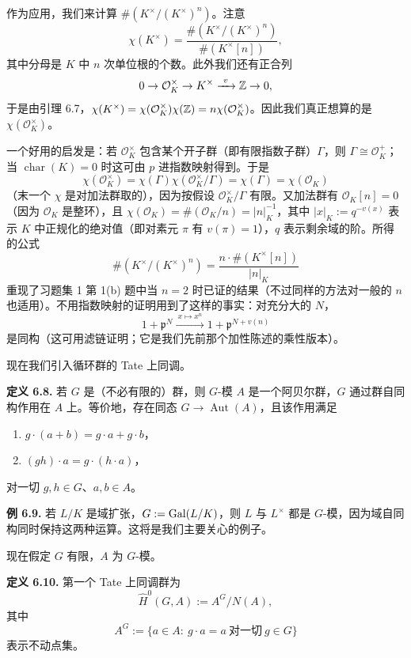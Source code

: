 作为应用，我们来计算 $\#(K^\times/(K^\times)^n)$。注意
\[
\chi(K^\times)=\frac{\#(K^\times/(K^\times)^n)}{\#(K^\times[n])},
\]
其中分母是 $K$ 中 $n$ 次单位根的个数。此外我们还有正合列
\[
0\to\mathcal{O}_K^\times\to K^\times\xrightarrow{\ v\ }\mathbb{Z}\to 0,
\]
于是由引理 6.7，$\chi(K^\times)=\chi(\mathcal{O}_K^\times)\chi(\mathbb{Z})=n\chi(\mathcal{O}_K^\times)$。因此我们真正想算的是 $\chi(\mathcal{O}_K^\times)$。

一个好用的启发是：若 $\mathcal{O}_K^\times$ 包含某个开子群（即有限指数子群）$\Gamma$，则 $\Gamma\cong\mathcal{O}_K^+$；当 $\operatorname{char}(K)=0$ 时这可由 $p$ 进指数映射得到。于是
\begin{equation}\tag{6.2}
\chi(\mathcal{O}_K^\times)=\chi(\Gamma)\chi(\mathcal{O}_K^\times/\Gamma)=\chi(\Gamma)=\chi(\mathcal{O}_K)
\end{equation}
（末一个 $\chi$ 是对加法群取的），因为按假设 $\mathcal{O}_K^\times/\Gamma$ 有限。又加法群有 $\mathcal{O}_K[n]=0$（因为 $\mathcal{O}_K$ 是整环），且 $\chi(\mathcal{O}_K)=\#(\mathcal{O}_K/n)=|n|_K^{-1}$，其中 $|x|_K:=q^{-v(x)}$ 表示 $K$ 中正规化的绝对值（即对素元 $\pi$ 有 $v(\pi)=1$），$q$ 表示剩余域的阶。所得的公式
\begin{equation}\tag{6.3}
\#(K^\times/(K^\times)^n)=\frac{n\cdot\#(K^\times[n])}{|n|_K}
\end{equation}
重现了习题集 1 第 1(b) 题中当 $n=2$ 时已证的结果（不过同样的方法对一般的 $n$ 也适用）。不用指数映射的证明用到了这样的事实：对充分大的 $N$，
\[
1+\mathfrak{p}^N\xrightarrow{\ x\mapsto x^n\ }1+\mathfrak{p}^{N+v(n)}
\]
是同构（这可用滤链证明；它是我们先前那个加性陈述的乘性版本）。

现在我们引入循环群的 Tate 上同调。

\textbf{定义 6.8.} 若 $G$ 是（不必有限的）群，则 $G$-模 $A$ 是一个阿贝尔群，$G$ 通过群自同构作用在 $A$ 上。等价地，存在同态 $G\to\operatorname{Aut}(A)$，且该作用满足
\begin{enumerate}[label=(\arabic*),leftmargin=2.2em,itemsep=0pt,topsep=2pt]
\item $g\cdot(a+b)=g\cdot a+g\cdot b$，
\item $(gh)\cdot a=g\cdot(h\cdot a)$，
\end{enumerate}
对一切 $g,h\in G$、$a,b\in A$。

\textbf{例 6.9.} 若 $L/K$ 是域扩张，$G:=\operatorname{Gal}(L/K)$，则 $L$ 与 $L^\times$ 都是 $G$-模，因为域自同构同时保持这两种运算。这将是我们主要关心的例子。

现在假定 $G$ 有限，$A$ 为 $G$-模。

\textbf{定义 6.10.} 第一个 Tate 上同调群为
\[
\widehat{H}^0(G,A):=A^G/N(A),
\]
其中
\[
A^G:=\{a\in A:\ g\cdot a=a\ \text{对一切}\ g\in G\}
\]
表示不动点集。

